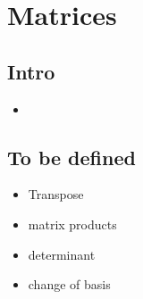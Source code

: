 \chapter{Matrices}\label{Matrices}  
\section{Intro}\label{Intro}
\begin{itemize}
  \item 
\end{itemize}



\newpage

\section{To be defined}\label{tbd}
\begin{itemize}
  \item Transpose
  \item matrix products
  \item determinant
  \item change of basis
\end{itemize}
